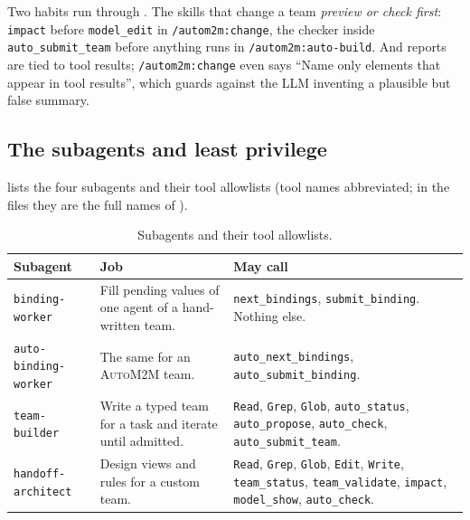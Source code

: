 \documentclass[10pt,a4paper]{article}
\newcommand{\auto}{\textsc{AutoM2M}}
\newcommand{\code}[1]{\texttt{#1}}
\newcommand{\mcptool}[1]{\texttt{#1}}
\newcommand{\skill}[1]{\texttt{/autom2m:#1}}
\begin{document}
Two habits run through . The skills that change a team
\emph{preview or check first}: \mcptool{impact} before \mcptool{model\_edit}
in \skill{change}, the checker inside \mcptool{auto\_submit\_team} before
anything runs in \skill{auto-build}. And reports are tied to tool results;
\skill{change} even says ``Name only elements that appear in tool
results'', which guards against the LLM inventing a plausible but false
summary.

\subsection{The subagents and least privilege}

 lists the four subagents and their tool allowlists (tool
names abbreviated; in the files they are the full names of
).

\begin{table}[!htb]
\centering\footnotesize
\caption{Subagents and their tool allowlists.}
\label{tab:agents}
\begin{tabularx}{\textwidth}{@{}l Y Y@{}}
\toprule
{}Subagent & Job & May call \\
\midrule
\code{binding-worker} & Fill pending values of one agent of a hand-written team. & \mcptool{next\_bindings}, \mcptool{submit\_binding}. Nothing else. \\
\code{auto-binding-worker} & The same for an \auto{} team. & \mcptool{auto\_next\_bindings}, \mcptool{auto\_submit\_binding}. \\
\code{team-builder} & Write a typed team for a task and iterate until admitted. & \code{Read}, \code{Grep}, \code{Glob}, \mcptool{auto\_status}, \mcptool{auto\_propose}, \mcptool{auto\_check}, \mcptool{auto\_submit\_team}. \\
\code{handoff-architect} & Design views and rules for a custom team. & \code{Read}, \code{Grep}, \code{Glob}, \code{Edit}, \code{Write}, \mcptool{team\_status}, \mcptool{team\_validate}, \mcptool{impact}, \mcptool{model\_show}, \mcptool{auto\_check}. \\
\bottomrule
\end{tabularx}
\end{table}
\end{document}
